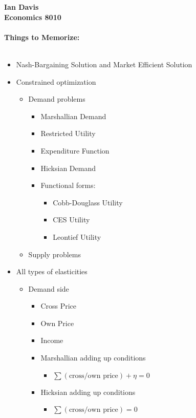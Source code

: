 
\let\counterwithout\relax
\let\counterwithin\relax
{}
\usepackage{listings}


\noindent \textbf{Ian Davis}\\
\noindent \textbf{Economics 8010}\\
\\
\noindent \textbf{Things to Memorize:}\\
\\
\begin{itemize}
	\item Nash-Bargaining Solution and Market Efficient Solution
	\item Constrained optimization
	\begin{itemize}
		\item Demand problems
		\begin{itemize}
			\item Marshallian Demand
			\item Restricted Utility
			\item Expenditure Function
			\item Hicksian Demand
			\item Functional forms:
			\begin{itemize}
				\item Cobb-Douglass Utility
				\item CES Utility
				\item Leontief Utility
			\end{itemize}
		\end{itemize}
		\item Supply problems
	\end{itemize}
	\item All types of elasticities
	\begin{itemize}
		\item Demand side
		\begin{itemize}
			\item Cross Price
			\item Own Price
			\item Income
			\item Marshallian adding up conditions
			\begin{itemize}
				\item $\sum (\text{cross/own price}) + \eta = 0$
			\end{itemize}
			\item Hicksian adding up conditions
			\begin{itemize}
				\item $\sum (\text{cross/own price}) = 0$

\end{itemize}
\end{itemize}
\end{itemize}
\end{itemize}
